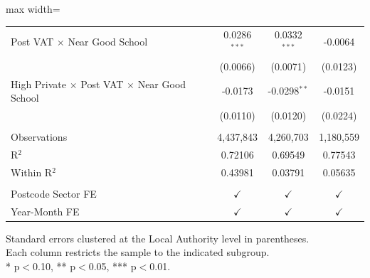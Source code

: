 \begin{table}[htbp]
\begin{adjustbox}{max width=\textwidth}
\begin{tabular}{lccc}
      Post VAT $\times$ Near Good School                                 & 0.0286$^{***}$  & 0.0332$^{***}$  & -0.0064\\
                                                                         & (0.0066)        & (0.0071)        & (0.0123)\\
      High Private $\times$ Post VAT $\times$ Near Good School           & -0.0173         & -0.0298$^{**}$  & -0.0151\\
                                                                         & (0.0110)        & (0.0120)        & (0.0224)\\   
       \\
      Observations                                                       & 4,437,843       & 4,260,703       & 1,180,559\\  
      R$^2$                                                              & 0.72106         & 0.69549         & 0.77543\\  
      Within R$^2$                                                       & 0.43981         & 0.03791         & 0.05635\\  
       \\
      Postcode Sector FE                                                  & $\checkmark$    & $\checkmark$    & $\checkmark$\\
      Year-Month FE                                                      & $\checkmark$    & $\checkmark$    & $\checkmark$\\   
      \bottomrule
   \end{tabular}
   \end{adjustbox}

   \par \raggedright 
   Standard errors clustered at the Local Authority level in parentheses.\\
   Each column restricts the sample to the indicated subgroup.\\
   * p$<$0.10, ** p$<$0.05, *** p$<$0.01.
\end{table}


